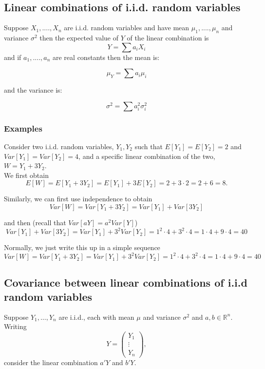 \documentclass[12pt,a4paper]{article}
\theoremstyle{regla}
\theoremstyle{remark}
\theoremstyle{definition}
\theoremstyle{nonumberbreak}
\begin{document}
\subsection{Linear combinations of i.i.d. random variables}
\begin{fbox}
\begin{minipage}{0.97\textwidth}
Suppose $X_1,....,X_n$ are i.i.d. random variables and have mean $\mu_1, ...., \mu_n$ and variance $\sigma^2$ 
then the expected value of $Y$ of the linear combination is 
$$Y=\sum a_i X_i$$
and if $a_1,....,a_n$ are real constants then the mean is:

$$\mu_Y = \sum a_i \mu_i$$

and the variance is:

$$\sigma^2 = \sum a^2_i \sigma^2_i$$
\end{minipage}
\end{fbox}
\subsubsection{Examples}
\begin{xmpl} 
Consider two i.i.d. random variables, 
$Y_1,Y_2$ such that $E[Y_1]=E[Y_2]=2$ and $Var[Y_1]=Var[Y_2]=4$,
and a specific  
linear combination of the two, 
$W=Y_1+3Y_2$.\\

We first obtain 
$$E[W]=E[Y_1+3Y_2]=E[Y_1]+3E[Y_2]=2+3\cdot 2=2+6=8.$$

Similarly, we 
can first use independence 
to obtain
$$Var[W]=Var[Y_1+3Y_2]=Var[Y_1]+Var[3Y_2]$$

and then (recall that $Var[aY]=a^2Var[Y]$)
$$Var[Y_1]+Var[3Y_2]=Var[Y_1]+3^2Var[Y_2]=1^2 \cdot 4+3^2\cdot 4= 1 \cdot 4 + 9 \cdot 4= 40$$

Normally, 
we just write this up in 
a simple sequence
$$Var[W]=Var[Y_1+3Y_2]=Var[Y_1]+3^2Var[Y_2]=1^2 \cdot 4+3^2\cdot 4 = 1 \cdot 4 + 9 \cdot 4= 40$$
\end{xmpl}

\subsection{Covariance between linear combinations of i.i.d random variables}
\begin{fbox}
\begin{minipage}{0.97\textwidth}
Suppose $Y_1,\ldots,Y_n$ are i.i.d., each with mean $\mu$ and variance $\sigma^2$ and $a,b\in \mathbb{R}^n$.
Writing 
$$
 Y= \left(
 \begin{array}{ccc}
   Y_1  \\
   \vdots\\
   Y_n 
 \end{array} \right),
$$
consider the linear combination $a'Y$ and $b'Y$.
\end{minipage}
\end{fbox}
\end{document}
